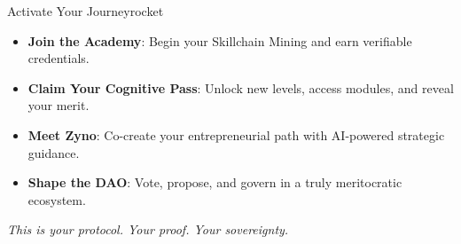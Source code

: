 \begin{mfai-box}{\faRocket\quad Activate Your Journey}{rocket}
\begin{itemize}
  \item \faGraduationCap\quad \textbf{Join the Academy}: Begin your Skillchain Mining\texttrademark{} and earn verifiable credentials.
  \item \faCertificate\quad \textbf{Claim Your Cognitive Pass}: Unlock new levels, access modules, and reveal your merit.
  \item \faBrain\quad \textbf{Meet Zyno}: Co-create your entrepreneurial path with AI-powered strategic guidance.
  \item \faGavel\quad \textbf{Shape the DAO}: Vote, propose, and govern in a truly meritocratic ecosystem.
\end{itemize}
\vspace{0.5em}
\textit{This is your protocol. Your proof. Your sovereignty.}
\end{mfai-box}

\vspace{1em}
\begin{center}
\end{center}
